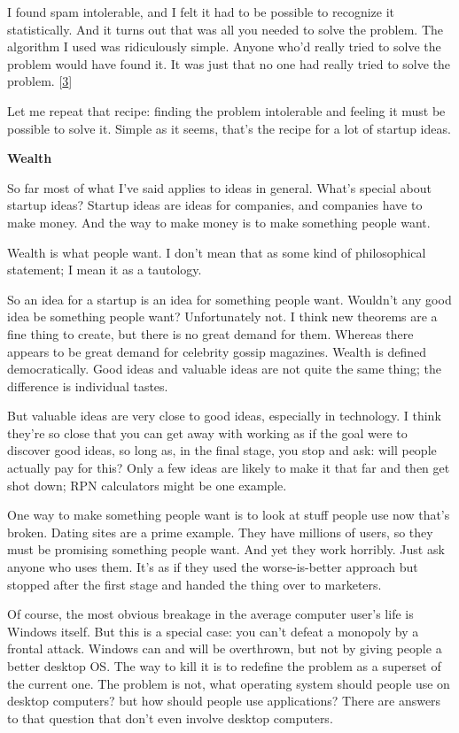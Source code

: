 I found spam intolerable, and I felt it had to be possible to recognize
it statistically. And it turns out that was all you needed to solve the
problem. The algorithm I used was ridiculously simple. Anyone who'd
really tried to solve the problem would have found it. It was just that
no one had really tried to solve the problem. {[}\hyperref[f3n]{3}{]}

Let me repeat that recipe: finding the problem intolerable and feeling
it must be possible to solve it. Simple as it seems, that's the recipe
for a lot of startup ideas.

\textbf{Wealth}

So far most of what I've said applies to ideas in general. What's
special about startup ideas? Startup ideas are ideas for companies, and
companies have to make money. And the way to make money is to make
something people want.

Wealth is what people want. I don't mean that as some kind of
philosophical statement; I mean it as a tautology.

So an idea for a startup is an idea for something people want. Wouldn't
any good idea be something people want? Unfortunately not. I think new
theorems are a fine thing to create, but there is no great demand for
them. Whereas there appears to be great demand for celebrity gossip
magazines. Wealth is defined democratically. Good ideas and valuable
ideas are not quite the same thing; the difference is individual tastes.

But valuable ideas are very close to good ideas, especially in
technology. I think they're so close that you can get away with working
as if the goal were to discover good ideas, so long as, in the final
stage, you stop and ask: will people actually pay for this? Only a few
ideas are likely to make it that far and then get shot down; RPN
calculators might be one example.

One way to make something people want is to look at stuff people use now
that's broken. Dating sites are a prime example. They have millions of
users, so they must be promising something people want. And yet they
work horribly. Just ask anyone who uses them. It's as if they used the
worse-is-better approach but stopped after the first stage and handed
the thing over to marketers.

Of course, the most obvious breakage in the average computer user's life
is Windows itself. But this is a special case: you can't defeat a
monopoly by a frontal attack. Windows can and will be overthrown, but
not by giving people a better desktop OS. The way to kill it is to
redefine the problem as a superset of the current one. The problem is
not, what operating system should people use on desktop computers? but
how should people use applications? There are answers to that question
that don't even involve desktop computers.

